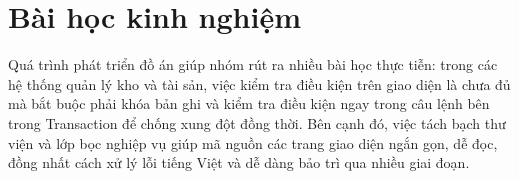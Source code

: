 \section{Bài học kinh nghiệm}

Quá trình phát triển đồ án giúp nhóm rút ra nhiều bài học thực tiễn: trong các hệ thống quản lý kho và tài sản, việc kiểm tra điều kiện trên giao diện là chưa đủ mà bắt buộc phải khóa bản ghi và kiểm tra điều kiện ngay trong câu lệnh  bên trong Transaction để chống xung đột đồng thời. Bên cạnh đó, việc tách bạch thư viện  và lớp bọc nghiệp vụ  giúp mã nguồn các trang giao diện ngắn gọn, dễ đọc, đồng nhất cách xử lý lỗi tiếng Việt và dễ dàng bảo trì qua nhiều giai đoạn.

